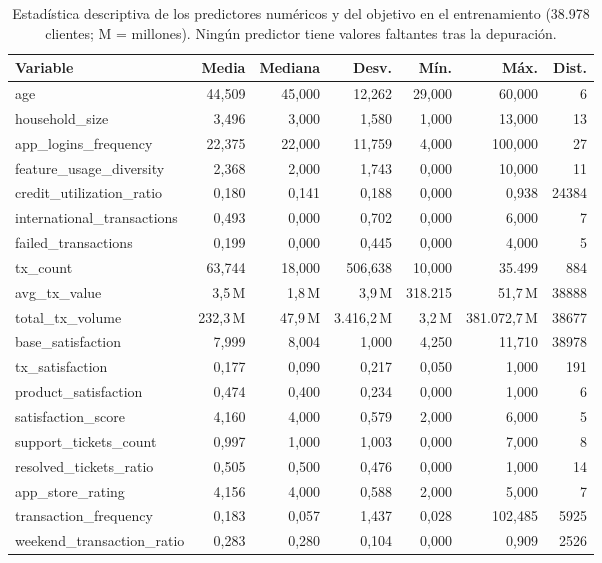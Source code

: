 \begin{table}[htbp]
\caption{Estadística descriptiva de los predictores numéricos y del objetivo en el entrenamiento (38.978 clientes; M = millones). Ningún predictor tiene valores faltantes tras la depuración.}\label{tab:descriptiva}
\scriptsize\setlength{\tabcolsep}{2pt}
\begin{tabular}{lrrrrrr}
\toprule
\textbf{Variable} & \textbf{Media} & \textbf{Mediana} & \textbf{Desv.} & \textbf{Mín.} & \textbf{Máx.} & \textbf{Dist.} \\
\midrule
age & 44,509 & 45,000 & 12,262 & 29,000 & 60,000 & 6 \\
household\_size & 3,496 & 3,000 & 1,580 & 1,000 & 13,000 & 13 \\
app\_logins\_frequency & 22,375 & 22,000 & 11,759 & 4,000 & 100,000 & 27 \\
feature\_usage\_diversity & 2,368 & 2,000 & 1,743 & 0,000 & 10,000 & 11 \\
credit\_utilization\_ratio & 0,180 & 0,141 & 0,188 & 0,000 & 0,938 & 24384 \\
international\_transactions & 0,493 & 0,000 & 0,702 & 0,000 & 6,000 & 7 \\
failed\_transactions & 0,199 & 0,000 & 0,445 & 0,000 & 4,000 & 5 \\
tx\_count & 63,744 & 18,000 & 506,638 & 10,000 & 35.499 & 884 \\
avg\_tx\_value & 3,5\,M & 1,8\,M & 3,9\,M & 318.215 & 51,7\,M & 38888 \\
total\_tx\_volume & 232,3\,M & 47,9\,M & 3.416,2\,M & 3,2\,M & 381.072,7\,M & 38677 \\
base\_satisfaction & 7,999 & 8,004 & 1,000 & 4,250 & 11,710 & 38978 \\
tx\_satisfaction & 0,177 & 0,090 & 0,217 & 0,050 & 1,000 & 191 \\
product\_satisfaction & 0,474 & 0,400 & 0,234 & 0,000 & 1,000 & 6 \\
satisfaction\_score & 4,160 & 4,000 & 0,579 & 2,000 & 6,000 & 5 \\
support\_tickets\_count & 0,997 & 1,000 & 1,003 & 0,000 & 7,000 & 8 \\
resolved\_tickets\_ratio & 0,505 & 0,500 & 0,476 & 0,000 & 1,000 & 14 \\
app\_store\_rating & 4,156 & 4,000 & 0,588 & 2,000 & 5,000 & 7 \\
transaction\_frequency & 0,183 & 0,057 & 1,437 & 0,028 & 102,485 & 5925 \\
weekend\_transaction\_ratio & 0,283 & 0,280 & 0,104 & 0,000 & 0,909 & 2526 \\

\end{tabular}
\end{table}
